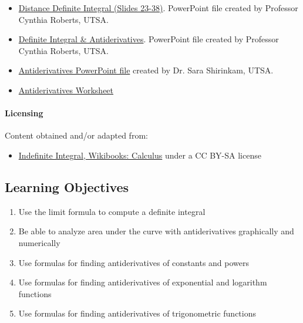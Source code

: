 \begin{itemize}
    \item \href{https://mathresearch.utsa.edu/wikiFiles/MAT1193/The\%20Definite\%20Integral/Presentation11_Distance_Definite_Integral.pptx}{Distance Definite Integral (Slides 23-38)}. PowerPoint file created by Professor Cynthia Roberts, UTSA.
    \item \href{https://mathresearch.utsa.edu/wikiFiles/MAT1193/The\%20Definite\%20Integral/Presentation12_DefiniteIntegral\%20\&\%20Antiderivatives.pptx}{Definite Integral \& Antiderivatives}. PowerPoint file created by Professor Cynthia Roberts, UTSA.
    \item \href{https://mathresearch.utsa.edu/wikiFiles/MAT1214/Antiderivatives/MAT1214-4.10AntiderivativesPwPt.pptx}{Antiderivatives PowerPoint file} created by Dr. Sara Shirinkam, UTSA.
    \item \href{https://mathresearch.utsa.edu/wikiFiles/MAT1214/Antiderivatives/MAT1214-4.10AntiderivativesWS1.pdf}{Antiderivatives Worksheet}
\end{itemize}

\paragraph{Licensing}



Content obtained and/or adapted from:  

\begin{itemize}
    \item \href{https://en.wikibooks.org/wiki/Calculus/Indefinite_integral}{Indefinite Integral, Wikibooks: Calculus} under a CC BY-SA license
\end{itemize}

\subsection{Learning Objectives}

\begin{enumerate}
    \item Use the limit formula to compute a definite integral
    \item Be able to analyze area under the curve with antiderivatives graphically and numerically
    \item Use formulas for finding antiderivatives of constants and powers
    \item Use formulas for finding antiderivatives of exponential and logarithm functions
    \item Use formulas for finding antiderivatives of trigonometric functions
\end{enumerate}

